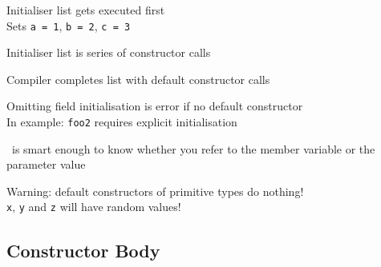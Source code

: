 \begin{frame}
\begin{overprint}

  \end{overprint}

  \begin{overprint}
    \begin{center}
      Initialiser list gets executed first \\
      Sets \texttt{a = 1}, \texttt{b = 2}, \texttt{c = 3}
    \end{center}

    \begin{center}
      Initialiser list is series of constructor calls
    \end{center}

    \begin{center}
      Compiler completes list with default constructor calls
    \end{center}

    \begin{center}
      Omitting field initialisation is error if no default constructor \\
      In example: \texttt{foo2} requires explicit initialisation
    \end{center}

    \begin{center}
      \cpp\ is smart enough to know whether you refer to the member
      variable or the parameter value
    \end{center}

    \begin{center}
      Warning: default constructors of primitive types do nothing! \\
      \texttt{x}, \texttt{y} and \texttt{z} will have random values!
    \end{center}
  \end{overprint}
\end{frame}

\subsection{Constructor Body}
\frame{\tableofcontents[currentsubsection]}

